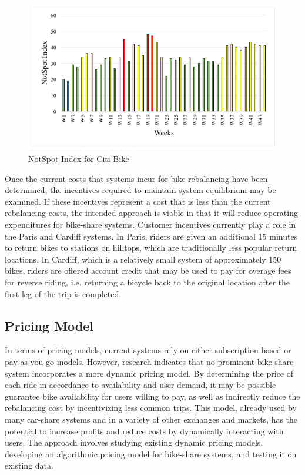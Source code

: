 \documentclass{sig-alternate}
\begin{document}
\begin{figure}[htb!]	\begin{center}
		\includegraphics[width=1.0\linewidth]{notspot}
	\end{center}
	\vspace{-12pt}
	\caption{NotSpot Index for Citi Bike}
	\label{fig:heatmap}
\end{figure}

Once the current costs that systems incur for bike rebalancing have been determined, the incentives required to maintain system equilibrium may be examined. If these incentives represent a cost that is less than the current rebalancing costs, the intended approach is viable in that it will reduce operating expenditures for bike-share systems. Customer incentives currently play a role in the Paris and Cardiff systems. In Paris, riders are given an additional 15 minutes to return bikes to stations on hilltops, which are traditionally less popular return locations. In Cardiff, which is a relatively small system of approximately 150 bikes, riders are offered account credit that may be used to pay for overage fees for reverse riding, i.e. returning a bicycle back to the original location after the first leg of the trip is completed.

\subsection{Pricing Model}

In terms of pricing models, current systems rely on either subscription-based or pay-as-you-go models. However, research indicates that no prominent bike-share system incorporates a more dynamic pricing model. By determining the price of each ride in accordance to availability and user demand, it may be possible guarantee bike availability for users willing to pay, as well as indirectly reduce the rebalancing cost by incentivizing less common trips. This model, already used by many car-share systems and in a variety of other exchanges and markets, has the potential to increase profits and reduce costs by dynamically interacting with users. The approach involves studying existing dynamic pricing models, developing an algorithmic pricing model for bike-share systems, and testing it on existing data. \newline
\end{document}
